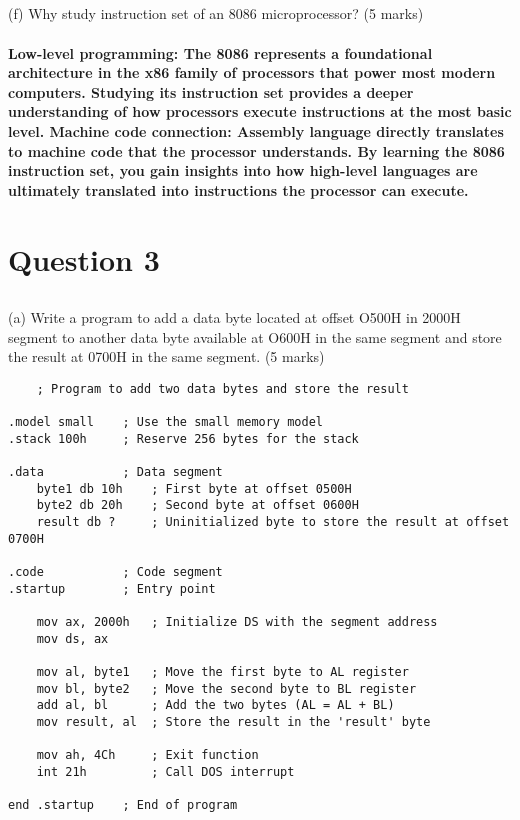 \documentclass[article]{article}
\begin{document}
\subsection*{}(f) Why study instruction set of an 8086 microprocessor? (5 marks)
\paragraph{Low-level programming: The 8086 represents a foundational architecture in the x86 family of processors that power most modern computers. Studying its instruction set provides a deeper understanding of how processors execute instructions at the most basic level.
Machine code connection: Assembly language directly translates to machine code that the processor understands. By learning the 8086 instruction set, you gain insights into how high-level languages are ultimately translated into instructions the processor can execute.}
\newpage
\section{Question 3}
\subsection*{}(a) Write a program to add a data byte located at offset O500H in 2000H segment to another data byte available at O600H in the same segment and store the result at 0700H in the same segment. (5 marks)

\begin{lstlisting}
    ; Program to add two data bytes and store the result

.model small    ; Use the small memory model
.stack 100h     ; Reserve 256 bytes for the stack

.data           ; Data segment
    byte1 db 10h    ; First byte at offset 0500H
    byte2 db 20h    ; Second byte at offset 0600H
    result db ?     ; Uninitialized byte to store the result at offset 0700H

.code           ; Code segment
.startup        ; Entry point

    mov ax, 2000h   ; Initialize DS with the segment address
    mov ds, ax

    mov al, byte1   ; Move the first byte to AL register
    mov bl, byte2   ; Move the second byte to BL register
    add al, bl      ; Add the two bytes (AL = AL + BL)
    mov result, al  ; Store the result in the 'result' byte

    mov ah, 4Ch     ; Exit function
    int 21h         ; Call DOS interrupt

end .startup    ; End of program
\end{lstlisting}
\end{document}
